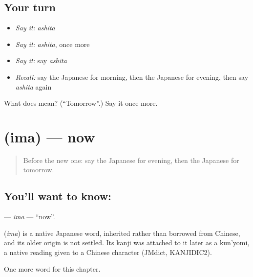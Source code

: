 \subsection*{Your turn}
\begin{itemize}
\raggedright
  \item \emph{Say it:} \emph{ashita}
  \item \emph{Say it:} \emph{ashita}, once more
  \item \emph{Say it:} say \emph{ashita}
  \item \emph{Recall:} say the Japanese for morning, then the Japanese for evening, then say \emph{ashita} again
\end{itemize}

\begin{tcolorbox}[breakable,colback=teal!4,colframe=teal!35!black,title={Before you move on}]
What does  mean? (\textquotedblleft{}Tomorrow\textquotedblright{}.) Say it once more.
\end{tcolorbox}
\section[\texorpdfstring{\ja{いま} (ima)}{いま (ima)}]{ (ima) — now}

\label{lesson:JA-C54-ima}



\begin{quote}
Before the new one: say the Japanese for evening, then the Japanese for tomorrow.
\end{quote}

\subsection*{You'll want to know: }
\textbf{} — \emph{ima} — \textquotedblleft{}now\textquotedblright{}.

\begin{cousinweb}
\textbf{} (\emph{ima}) is a native Japanese word, inherited rather than borrowed from Chinese, and its older origin is not settled. Its kanji was attached to it later as a kun'yomi, a native reading given to a Chinese character (JMdict, KANJIDIC2).
\end{cousinweb}

\begin{grammarlens}[title={What you've built}]
One more word for this chapter.
\end{grammarlens}

